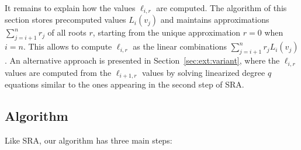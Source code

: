 \documentclass{sig-alternate}
\newcounter{algo}
\begin{document}
It remains to explain how the values $\ell_{i,r}$ are computed.
The algorithm of this section stores precomputed values $L_i(v_{j})$ and maintains approximations $\sum_{j=i+1}^nr_j$ of all roots $r$, starting from the unique approximation $r=0$ when $i=n$. 
This allows to compute $\ell_{i,r}$ as the linear combinations $\sum_{j=i+1}^nr_jL_i(v_{j})$. 
An alternative approach is presented in Section~\ref{sec:ext:variant}, where the $\ell_{i,r}$ values are computed from the $\ell_{i+1,r}$ values by solving linearized degree $q$ equations similar to the ones appearing in the second step of SRA.


\subsection{Algorithm\label{sec:alg:alg}}
Like SRA, our algorithm has three main steps:
\end{document}
